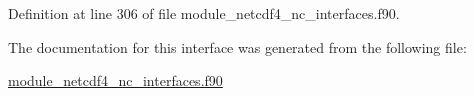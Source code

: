Definition at line 306 of file module\+\_\+netcdf4\+\_\+nc\+\_\+interfaces.\+f90.



The documentation for this interface was generated from the following file\+:\begin{DoxyCompactItemize}
\item 
\hyperlink{module__netcdf4__nc__interfaces_8f90}{module\+\_\+netcdf4\+\_\+nc\+\_\+interfaces.\+f90}\end{DoxyCompactItemize}
